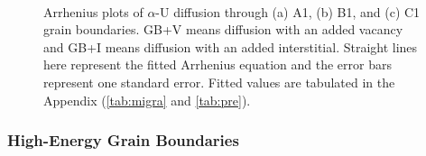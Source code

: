 \documentclass[review]{elsarticle}
\begin{document}
\begin{figure}[h!]
\centering
{}
\\
\caption{Arrhenius plots of $\alpha$-U diffusion through (a) A1, (b) B1, and (c) C1 grain boundaries. GB+V means diffusion with an added vacancy and GB+I means diffusion with an added interstitial. Straight lines here represent the fitted Arrhenius equation and the error bars represent one standard error. Fitted values are tabulated in the Appendix (\ref{tab:migra} and \ref{tab:pre}).}
\label{fig:Dif_fit1}
\end{figure}

\subsubsection{High-Energy Grain Boundaries}
\end{document}
